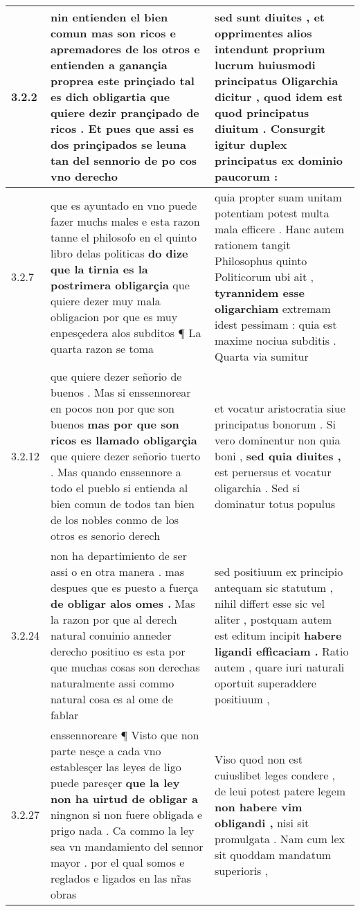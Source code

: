 \begin{tabular}{|p{1cm}|p{6.5cm}|p{6.5cm}|}

\hline
3.2.2 & nin entienden el bien comun mas son ricos e apremadores de los otros e entienden a ganançia proprea este prinçiado \textbf{ tal es dich obligartia } que quiere dezir prançipado de ricos . Et pues que assi es dos prinçipados se leuna tan del sennorio de po cos vno derecho & sed sunt diuites , et opprimentes alios intendunt proprium lucrum huiusmodi principatus Oligarchia dicitur , \textbf{ quod idem est } quod principatus diuitum . Consurgit igitur duplex principatus ex dominio paucorum : \\\hline
3.2.7 & que es ayuntado en vno puede fazer muchs males e esta razon tanne el philosofo en el quinto libro delas politicas \textbf{ do dize que la tirnia es la postrimera obligarçia } que quiere dezer muy mala obligacion por que es muy enpesçedera alos subditos ¶ La quarta razon se toma & quia propter suam unitam potentiam potest multa mala efficere . Hanc autem rationem tangit Philosophus quinto Politicorum ubi ait , \textbf{ tyrannidem esse oligarchiam } extremam idest pessimam : quia est maxime nociua subditis . Quarta via sumitur \\\hline
3.2.12 & que quiere dezer señorio de buenos . Mas si enssennorear en pocos non por que son buenos \textbf{ mas por que son ricos es llamado obligarçia } que quiere dezer señorio tuerto . Mas quando enssennore a todo el pueblo si entienda al bien comun de todos tan bien de los nobles conmo de los otros es senorio derech & et vocatur aristocratia siue principatus bonorum . Si vero dominentur non quia boni , \textbf{ sed quia diuites , } est peruersus et vocatur oligarchia . Sed si dominatur totus populus \\\hline
3.2.24 & non ha departimiento de ser assi o en otra manera . mas despues que es puesto a fuerça \textbf{ de obligar alos omes . } Mas la razon por que al derech natural conuinio anneder derecho positiuo es esta por que muchas cosas son derechas naturalmente assi commo natural cosa es al ome de fablar & sed positiuum ex principio antequam sic statutum , nihil differt esse sic vel aliter , postquam autem est editum incipit \textbf{ habere ligandi efficaciam . } Ratio autem , quare iuri naturali oportuit superaddere positiuum , \\\hline
3.2.27 & enssennoreare ¶ Visto que non parte nesçe a cada vno establesçer las leyes de ligo puede paresçer \textbf{ que la ley non ha uirtud de obligar a } ningnon si non fuere obligada e prigo nada . Ca commo la ley sea vn mandamiento del sennor mayor . por el qual somos e reglados e ligados en las nr̃as obras & Viso quod non est cuiuslibet leges condere , de leui potest patere legem \textbf{ non habere vim obligandi , } nisi sit promulgata . Nam cum lex sit quoddam mandatum superioris , \\\hline

\end{tabular}
